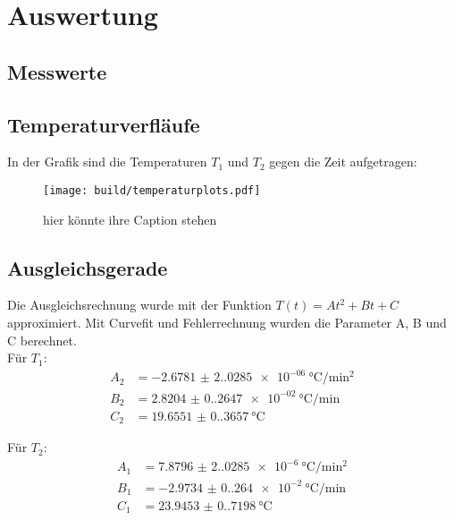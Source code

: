 \section{Auswertung}
\label{sec:Auswertung}

\subsection{Messwerte}
\begin{center}
\end{center}

\subsection{Temperaturverfläufe}
In der Grafik sind die Temperaturen $T_1$ und $T_2$ gegen die Zeit aufgetragen:
\begin{figure}[H]
  \centering
  \texttt{[image: build/temperaturplots.pdf]}
  \caption{hier könnte ihre Caption stehen}
\end{figure}

\subsection{Ausgleichsgerade}
Die Ausgleichsrechnung wurde mit der Funktion $T(t) = A t^2 + B t + C$ approximiert. Mit Curvefit und Fehlerrechnung 
wurden die Parameter A, B und C berechnet.\\
Für $T_1$:
\begin{align*}%
  A_2 &= \SI{-2.6781(2.0285)e-06}{\degreeCelsius\per\square\minute}\\
  B_2 &= \SI{2.8204(0.2647)e-02}{\degreeCelsius\per\minute}\\
  C_2 &= \SI{19.6551(0.3657)}{\degreeCelsius}
\end{align*}

Für $T_2$:
\begin{align*}
  A_1 &= \SI{7.8796(2.0285)e-6}{\degreeCelsius\per\square\minute}\\
  B_1 &= \SI{-2.9734(0.264)e-2}{\degreeCelsius\per\minute}\\
  C_1 &= \SI{23.9453(0.7198)}{\degreeCelsius}
\end{align*}


